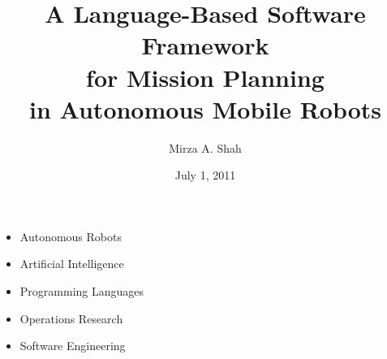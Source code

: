 \documentclass{beamer}
\title[MPFL] %
{A Language-Based Software Framework \\for Mission Planning\\in Autonomous Mobile Robots}
\author[Mirza A. Shah] %
{Mirza A. Shah}
\institute[Penn State CSE] %
{\textbf{Department of Computer Science \& Engineering}\\\textbf{Penn State University}
\\M.S. Thesis Defense\\Advisor: Dr. John Hannan}
\date[] %
{July 1, 2011}
\begin{document}
\begin{frame}
  \titlepage
\end{frame}

\begin{frame}
	\begin{itemize}
	\item Autonomous Robots
	\item Artificial Intelligence
	\item Programming Languages
	\item Operations Research
	\item Software Engineering
	\end{itemize}
\end{frame}

\begin{frame}
\end{frame}

\begin{frame}
\end{frame}

\begin{frame}
\end{frame}

\begin{frame}
\end{frame}

\begin{frame}
\end{frame}

\begin{frame}
\end{frame}
\end{document}
